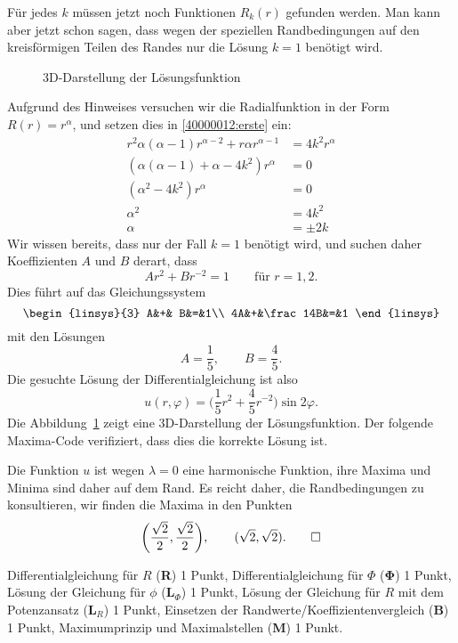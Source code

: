 \begin{loesung}
\begin{teilaufgaben}
Für jedes $k$ müssen jetzt noch Funktionen $R_k(r)$ gefunden werden.
Man kann aber jetzt schon sagen, dass wegen der speziellen Randbedingungen
auf den kreisförmigen Teilen des Randes nur die Lösung $k=1$ benötigt wird.

\begin{figure}
\centering
{}
\caption{3D-Darstellung der Lösungsfunktion
\label{40000012:3d}}
\end{figure}
Aufgrund des Hinweises versuchen wir die Radialfunktion in der Form
$R(r)=r^\alpha$, und setzen dies in \eqref{40000012:erste} ein:
\begin{align*}
r^2\alpha(\alpha-1)r^{\alpha-2}+r\alpha r^{\alpha-1}&=4k^2r^{\alpha}
\\
(\alpha(\alpha-1)+\alpha -4k^2)r^{\alpha}&=0
\\
(\alpha^2 -4k^2)r^{\alpha}&=0
\\
\alpha^2&=4k^2
\\
\alpha&=\pm2k
\end{align*}
Wir wissen bereits, dass nur der Fall $k=1$ benötigt wird, und suchen
daher Koeffizienten $A$ und $B$ derart, dass
\[
Ar^2+Br^{-2}=1\qquad \text{für $r=1,2$.}
\]
Dies führt auf das Gleichungssystem
\[
\begin{linsys}{3}
 A&+&       B&=&1\\
4A&+&\frac14B&=&1
\end{linsys}
\]
mit den Lösungen
\[
A=\frac15,\qquad B=\frac45.
\]
Die gesuchte Lösung der Differentialgleichung ist also
\[
u(r,\varphi)=\biggl(\frac15r^2+\frac45r^{-2}\biggr)\sin 2\varphi.
\]
Die Abbildung~\ref{40000012:3d} zeigt eine 3D-Darstellung der Lösungsfunktion.
Der folgende Maxima-Code verifiziert, dass dies die korrekte Lösung ist.
\item
Die Funktion $u$ ist wegen $\lambda=0$ eine harmonische Funktion, ihre
Maxima und Minima sind daher auf dem Rand.
Es reicht daher, die Randbedingungen zu konsultieren, wir finden die
Maxima in den Punkten
\[
\biggl(\frac{\sqrt{2}}{2},\frac{\sqrt{2}}2\biggr),\qquad
(\sqrt{2},\sqrt{2}).
\qedhere
\]
\end{teilaufgaben}
\end{loesung}

\begin{bewertung}
Differentialgleichung für $R$ ({\bf R}) 1 Punkt,
Differentialgleichung für $\Phi$ ({$\mathbf \Phi$}) 1 Punkt,
Lösung der Gleichung für $\phi$ ($\textbf{L}_\Phi$) 1 Punkt,
Lösung der Gleichung für $R$ mit dem Potenzansatz ($\textbf{L}_R$) 1 Punkt,
Einsetzen der Randwerte/Koeffizientenvergleich ({\bf B}) 1 Punkt,
Maximumprinzip und Maximalstellen ({\bf M}) 1 Punkt.
\end{bewertung}


